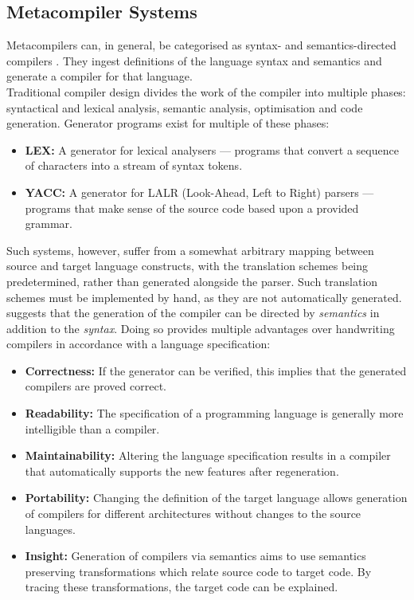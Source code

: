 \documentclass[a4paper,11pt]{report}
\begin{document}
\subsection{Metacompiler Systems} %
\label{sub:metacompiler_systems}
Metacompilers can, in general, be categorised as syntax- and semantics-directed compilers \citep{Mandell:1966:MDA:800267.810785,diehl1996semantics}.
They ingest definitions of the language syntax and semantics and generate a compiler for that language. \\

Traditional compiler design divides the work of the compiler into multiple phases: syntactical and lexical analysis, semantic analysis, optimisation and code generation. 
Generator programs exist for multiple of these phases:
\begin{itemize}
    \item \textbf{LEX:} A generator for lexical analysers --- programs that convert a sequence of characters into a stream of syntax tokens.
    \item \textbf{YACC:} A generator for LALR (Look-Ahead, Left to Right) parsers --- programs that make sense of the source code based upon a provided grammar.
\end{itemize}

Such systems, however, suffer from a somewhat arbitrary mapping between source and target language constructs, with the translation schemes being predetermined, rather than generated alongside the parser. 
Such translation schemes must be implemented by hand, as they are not automatically generated. \\

\citet{diehl1996semantics} suggests that the generation of the compiler can be directed by \textit{semantics} in addition to the \textit{syntax}.
Doing so provides multiple advantages over handwriting compilers in accordance with a language specification:
\begin{itemize}
    \item \textbf{Correctness:} If the generator can be verified, this implies that the generated compilers are proved correct.
    \item \textbf{Readability:} The specification of a programming language is generally more intelligible than a compiler.
    \item \textbf{Maintainability:} Altering the language specification results in a compiler that automatically supports the new features after regeneration.
    \item \textbf{Portability:} Changing the definition of the target language allows generation of compilers for different architectures without changes to the source languages.
    \item \textbf{Insight:} Generation of compilers via semantics aims to use semantics preserving transformations which relate source code to target code. 
    By tracing these transformations, the target code can be explained. 
\end{itemize}
\end{document}
